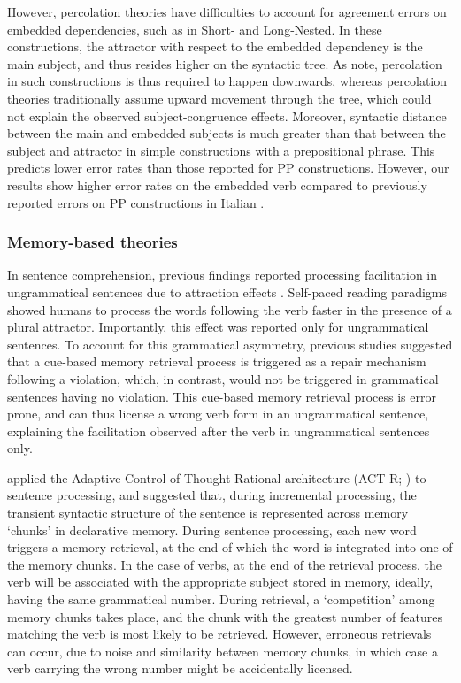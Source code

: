 However, percolation theories have difficulties to account for agreement errors on embedded dependencies, such as in Short- and Long-Nested. In these constructions, the attractor with respect to the embedded dependency is the main subject, and thus resides higher on the syntactic tree. As \citet{wagers2009agreement} note, percolation in such constructions is thus required to happen downwards, whereas percolation theories traditionally assume upward movement through the tree, which could not explain the observed subject-congruence effects. Moreover, syntactic distance between the main and embedded subjects is much greater than that between the subject and attractor in simple constructions with a prepositional phrase. This predicts lower error rates than those reported for PP constructions. However, our results show higher error rates on the embedded verb compared to previously reported errors on PP constructions in Italian \citep{vigliocco1995constructing}.

\subsubsection{Memory-based theories}
In sentence comprehension, previous findings reported processing facilitation in ungrammatical sentences due to attraction effects \citep[e.g., ][]{pearlmutter1999agreement, wagers2009agreement, lago2015agreement}. Self-paced reading paradigms showed humans to process the words following the verb faster in the presence of a plural attractor. Importantly, this effect was reported only for ungrammatical sentences. To account for this grammatical asymmetry, previous studies suggested that a cue-based memory retrieval process \citep{lewis2005activation} is triggered as a repair mechanism following a violation, which, in contrast, would not be triggered in grammatical sentences having no violation. This cue-based memory retrieval process is error prone, and can thus license a wrong verb form in an ungrammatical sentence, explaining the facilitation observed after the verb in ungrammatical sentences only. 


\citet{lewis2005activation} applied the Adaptive Control of Thought-Rational architecture (ACT-R; \citet{anderson2013architecture}) to sentence processing, and suggested that, during incremental processing, the transient syntactic structure of the sentence is represented across memory `chunks’ in declarative memory. During sentence processing, each new word triggers a memory retrieval, at the end of which the word is integrated into one of the memory chunks. In the case of verbs, at the end of the retrieval process, the verb will be associated with the appropriate subject stored in memory, ideally, having the same grammatical number. During retrieval, a `competition' among memory chunks takes place, and the chunk with the greatest number of features matching the verb is most likely to be retrieved. However, erroneous retrievals can occur, due to  noise and similarity between memory chunks, in which case a verb carrying the wrong number might be accidentally licensed. 

